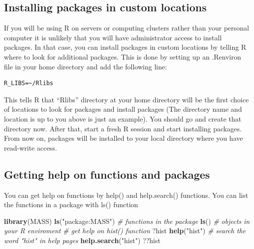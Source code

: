 \documentclass[12pt,]{krantz}
\newenvironment{Shaded}{\begin{snugshade}}{\end{snugshade}}
\newcommand{\CommentTok}[1]{\textcolor[rgb]{0.56,0.35,0.01}{\textit{#1}}}
\newcommand{\KeywordTok}[1]{\textcolor[rgb]{0.13,0.29,0.53}{\textbf{#1}}}
\newcommand{\NormalTok}[1]{#1}
\newcommand{\StringTok}[1]{\textcolor[rgb]{0.31,0.60,0.02}{#1}}
\theoremstyle{definition}
\theoremstyle{definition}
\theoremstyle{definition}
\theoremstyle{remark}
\begin{document}
\hypertarget{installing-packages-in-custom-locations}{%
\subsection{Installing packages in custom
locations}\label{installing-packages-in-custom-locations}}

If you will be using R on servers or computing clusters rather than your
personal computer it is unlikely that you will have administrator access
to install packages. In that case, you can install packages in custom
locations by telling R where to look for additional packages. This is
done by setting up an .Renviron file in your home directory and add the
following line:

\begin{verbatim}
R_LIBS=~/Rlibs
\end{verbatim}

This tells R that ``Rlibs'' directory at your home directory will be the
first choice of locations to look for packages and install packages (The
directory name and location is up to you above is just an example). You
should go and create that directory now. After that, start a fresh R
session and start installing packages. From now on, packages will be
installed to your local directory where you have read-write access.

\hypertarget{getting-help-on-functions-and-packages}{%
\subsection{Getting help on functions and
packages}\label{getting-help-on-functions-and-packages}}

You can get help on functions by help() and help.search() functions. You
can list the functions in a package with ls() function

\begin{Shaded}
\begin{Highlighting}[]
\KeywordTok{library}\NormalTok{(MASS)}
\KeywordTok{ls}\NormalTok{(}\StringTok{"package:MASS"}\NormalTok{) }\CommentTok{# functions in the package}
\KeywordTok{ls}\NormalTok{() }\CommentTok{# objects in your R enviroment}
\CommentTok{# get help on hist() function}
\NormalTok{?hist}
\KeywordTok{help}\NormalTok{(}\StringTok{"hist"}\NormalTok{)}
\CommentTok{# search the word "hist" in help pages}
\KeywordTok{help.search}\NormalTok{(}\StringTok{"hist"}\NormalTok{)}
\NormalTok{??hist}
\end{Highlighting}
\end{Shaded}
\end{document}
